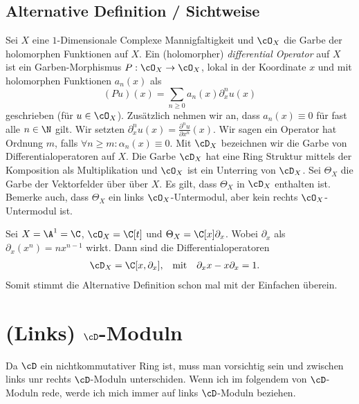 \subsection{Alternative Definition / Sichtweise}
\begin{comment}
Nur abgeschrieben
\end{comment}
\cite[Chap 1.1.]{kashiwara2003d}
Sei $X$ eine $1$-Dimensionale Complexe Mannigfaltigkeit und $\cO_X$ die Garbe
der holomorphen Funktionen auf $X$. Ein (holomorpher) \emph{differential
Operator} auf $X$ ist ein Garben-Morphismus $P:\cO_X\rightarrow \cO_X$, lokal
in der Koordinate $x$ und mit holomorphen Funktionen $a_n(x)$ als
\[
(Pu)(x)=\sum_{n\geq0}a_n(x)\partial_x^nu(x)
\]
geschrieben (für $u\in\cO_X$). Zusätzlich nehmen wir an, dass $a_n(x)\equiv 0$
für fast alle $n\in \N$ gilt. Wir setzten
$\partial_x^nu(x)=\frac{\partial^nu}{\partial x^n}(x)$. Wir sagen ein Operator
hat Ordnung $m$, falls $\forall n\geq m: \alpha_n(x)\equiv0$.  Mit $\cD_X$
bezeichnen wir die Garbe von Differentialoperatoren auf $X$. Die Garbe $\cD_X$
hat eine Ring Struktur mittels der Komposition als Multiplikation und $\cO_X$
ist ein Unterring von $\cD_X$. Sei $\Theta_X$ die Garbe der Vektorfelder über
über $X$. Es gilt, dass $\Theta_X$ in $\cD_X$ enthalten ist. Bemerke auch, dass
$\Theta_X$ ein links $\cO_X$-Untermodul, aber kein rechts $\cO_X$-Untermodul ist.

\begin{prop}
\cite[Exmp 1.1]{ArkhipovDmod}
Sei $X=\A^1=\C$, $\cO_X=\C[t]$ und $\Theta_X=\C[x]\partial_x$. Wobei $\partial_x$
als $\partial_x(x^n)=nx^{n-1}$ wirkt. Dann sind die Differentialoperatoren
\begin{align*}
\cD_X &= \C[x,\partial_x], & \mbox{mit} & & \partial_x x-x\partial_x & =1.
\end{align*}
Somit stimmt die Alternative Definition schon mal mit der Einfachen überein.
\end{prop}

\begin{comment}
\begin{defn} \cite[Defn 2.1]{ArkhipovDmod}
Sei $X=\A^1$, $\cO_X=\C[x]$ und $\cD_X=[x,\partial_x]$ mit der Relation
$[\partial_x,x]=1$. Dann definieren wir die links $\cD$-Moduln über $\A^1$ als
die $\C[x,\partial_x]$-Moduln. Sie werden geschrieben als $\cD-mod(\A^1)$
\end{defn}
\end{comment}

\section{(Links) $\cD$-Moduln}
Da $\cD$ ein nichtkommutativer Ring ist, muss man vorsichtig sein und zwischen
links unr rechts $\cD$-Moduln unterschiden. Wenn ich im folgendem von
$\cD$-Moduln rede, werde ich mich immer
auf links $\cD$-Moduln beziehen.

